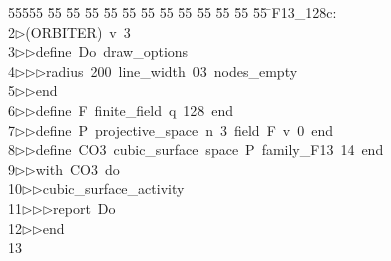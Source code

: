 %
%
\begin{tabbing}
55555 \= 55 \= 55 \= 55 \= 55 \= 55 \= 55 \= 55 \= 55 \= 55 \= 55 \= 55 \= 55 \= \>F13\_128c:\\[0pt]
2\>$\triangleright$\>(ORBITER)\ v\ 3\ \\[0pt]
3\>$\triangleright$\>$\triangleright$\>define\ Do\ draw\_options\ \\[0pt]
4\>$\triangleright$\>$\triangleright$\>$\triangleright$\>radius\ 200\ line\_width\ 03\ nodes\_empty\ \\[0pt]
5\>$\triangleright$\>$\triangleright$\>end\ \\[0pt]
6\>$\triangleright$\>$\triangleright$\>define\ F\ finite\_field\ q\ 128\ end\ \\[0pt]
7\>$\triangleright$\>$\triangleright$\>define\ P\ projective\_space\ n\ 3\ field\ F\ v\ 0\ end\ \\[0pt]
8\>$\triangleright$\>$\triangleright$\>define\ CO3\ cubic\_surface\ space\ P\ family\_F13\ 14\ end\ \\[0pt]
9\>$\triangleright$\>$\triangleright$\>with\ CO3\ do\ \\[0pt]
10\>$\triangleright$\>$\triangleright$\>cubic\_surface\_activity\ \\[0pt]
11\>$\triangleright$\>$\triangleright$\>$\triangleright$\>report\ Do\ \\[0pt]
12\>$\triangleright$\>$\triangleright$\>end\\[0pt]
13\>\end{tabbing}
